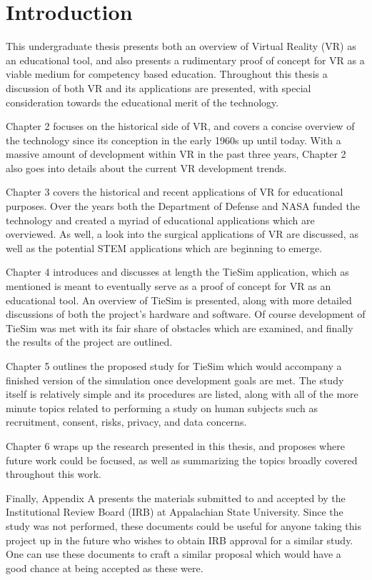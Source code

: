 \chapter{Introduction}

This undergraduate thesis presents both an overview of Virtual Reality (VR) as an educational tool, and also presents a rudimentary proof of concept for VR as a viable medium for competency based education. Throughout this thesis a discussion of both VR and its applications are presented, with special consideration towards the educational merit of the technology.

Chapter 2 focuses on the historical side of VR, and covers a concise overview of the technology since its conception in the early 1960s up until today. With a massive amount of development within VR in the past three years, Chapter 2 also goes into details about the current VR development trends.

Chapter 3 covers the historical and recent applications of VR for educational purposes. Over the years both the Department of Defense and NASA funded the technology and created a myriad of educational applications which are overviewed. As well, a look into the surgical applications of VR are discussed, as well as the potential STEM applications which are beginning to emerge.

Chapter 4 introduces and discusses at length the TieSim application, which as mentioned is meant to eventually serve as a proof of concept for VR as an educational tool. An overview of TieSim is presented, along with more detailed discussions of both the project's hardware and software. Of course development of TieSim was met with its fair share of obstacles which are examined, and finally the results of the project are outlined.

Chapter 5 outlines the proposed study for TieSim which would accompany a finished version of the simulation once development goals are met. The study itself is relatively simple and its procedures are listed, along with all of the more minute topics related to performing a study on human subjects such as recruitment, consent, risks, privacy, and data concerns.

Chapter 6 wraps up the research presented in this thesis, and proposes where future work could be focused, as well as summarizing the topics broadly covered throughout this work.

Finally, Appendix A presents the materials submitted to and accepted by the Institutional Review Board (IRB) at Appalachian State University. Since the study was not performed, these documents could be useful for anyone taking this project up in the future who wishes to obtain IRB approval for a similar study. One can use these documents to craft a similar proposal which would have a good chance at being accepted as these were.